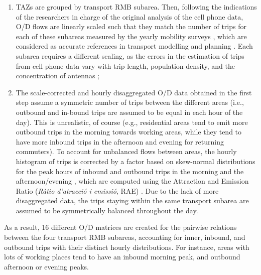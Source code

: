 \begin{enumerate}
    \item TAZs are grouped by transport RMB subarea. Then, following the indications of the researchers in charge of the original analysis of the cell phone data, O/D flows are linearly scaled such that they match the number of trips for each of these subareas measured by the yearly mobility surveys \citep{InstitutdEstudisRegionalsiMetropolitansdeBarcelonaIERMB2020,AreadeBarcelona.AutoritatdelTransportMetropolita2020}, which are considered as accurate references in transport modelling and planning \citep{Montero2019}. Each subarea requires a different scaling, as the errors in the estimation of trips from cell phone data vary with trip length, population density, and the concentration of antennas \citep{Calvet2020,Caceres2020};
    \item The scale-corrected and hourly disaggregated O/D data obtained in the first step assume a symmetric number of trips between the different areas (i.e., outbound and in-bound trips are assumed to be equal in each hour of the day). This is unrealistic, of course (e.g., residential areas tend to emit more outbound trips in the morning towards working areas, while they tend to have more inbound trips in the afternoon and evening for returning commuters). To account for unbalanced flows between areas, the hourly histogram of trips is corrected by a factor based on skew-normal distributions for the peak hours of inbound and outbound trips in the morning and the afternoon/evening \citep{Melakessou2015}, which are computed using the Attraction and Emission Ratio (\emph{Ràtio d’atracció i emissió}, RAE) \citep{InstitutdEstudisRegionalsiMetropolitansdeBarcelonaIERMB2020}. Due to the lack of more disaggregated data, the trips staying within the same transport subarea are assumed to be symmetrically balanced throughout the day.
\end{enumerate}

As a result, 16 different O/D matrices are created for the pairwise relations between the four transport RMB subareas, accounting for inner, inbound, and outbound trips with their distinct hourly distributions. For instance, areas with lots of working places tend to have an inbound morning peak, and outbound afternoon or evening peaks.


